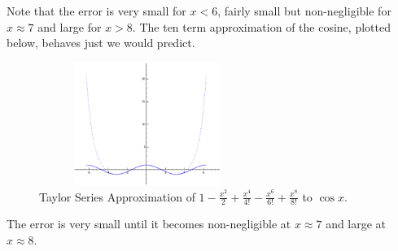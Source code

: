 \begin{example}
{  Note that the error is very small for $x < 6$, fairly small but non-negligible
  for $x \approx 7$ and large for $x > 8$.  The ten term approximation of
  the cosine, plotted below, behaves just we would predict.

\begin{figure}[h!]
\begin{minipage}{\textwidth}
\begin{center}
\includegraphics[height=4cm,width=7cm]{taycos10b.eps}
\end{center}
\end{minipage}
\caption{Taylor Series Approximation of $1-\frac{x^2}{2}+\frac{x^4}{4!}-\frac{x^6}{6!}+\frac{x^8}{8!}$ to $\cos x$.}
\label{fig:taycos10}
\label{taycos10}
\end{figure}


  The error is very small until it becomes non-negligible at $x \approx 7$
  and large at $x \approx 8$.
}
\end{example}


